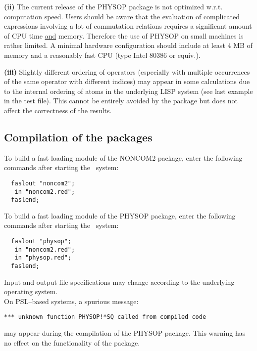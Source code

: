 {\bf (ii)} The current release of the PHYSOP package is not optimized
w.r.t. computation speed. Users should be aware that the evaluation
of complicated expressions involving a lot of commutation relations
requires a significant amount of CPU time \underline{and} memory.
Therefore the use of PHYSOP on small machines is rather limited. A
minimal hardware configuration should include at least 4 MB of
memory and a reasonably fast CPU (type Intel 80386 or equiv.).

{\bf (iii)} Slightly different ordering of operators (especially with
multiple occurrences of the same operator with different indices)
may appear in some calculations
due to the internal ordering of atoms in the underlying LISP system
(see last example in the test file). This cannot be entirely avoided
by the package but does not affect the correctness  of the results.

\subsection{Compilation of the packages}
To build a fast loading module of the NONCOM2 package, enter the
following commands after starting the \REDUCE\ system: \\

\begin{verbatim}
  faslout "noncom2";
   in "noncom2.red";
  faslend;
\end{verbatim}
To build a fast loading module of the PHYSOP package, enter the
following commands after starting the \REDUCE\ system: \\

\begin{verbatim}
  faslout "physop";
   in "noncom2.red";
   in "physop.red";
  faslend;
\end{verbatim}
Input and output file specifications may change according to the
underlying operating system. \\
On PSL--based systems, a spurious message: \\

\begin{verbatim}
*** unknown function PHYSOP!*SQ called from compiled code
\end{verbatim}
may appear during the compilation of the PHYSOP package. This warning
has no effect on the functionality of the package.

